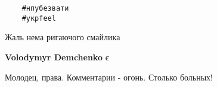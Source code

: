 \begingroup
\Large
\begin{verbatim}
	#нпубезвати
	#укрfeel
\end{verbatim}
\endgroup


Жаль нема ригаючого смайлика

\begin{itemize}

\textbf{Volodymyr Demchenko} є\Laughey[1.0][white]
\end{itemize}


Молодец, права. Комментарии - огонь. Столько больных!

